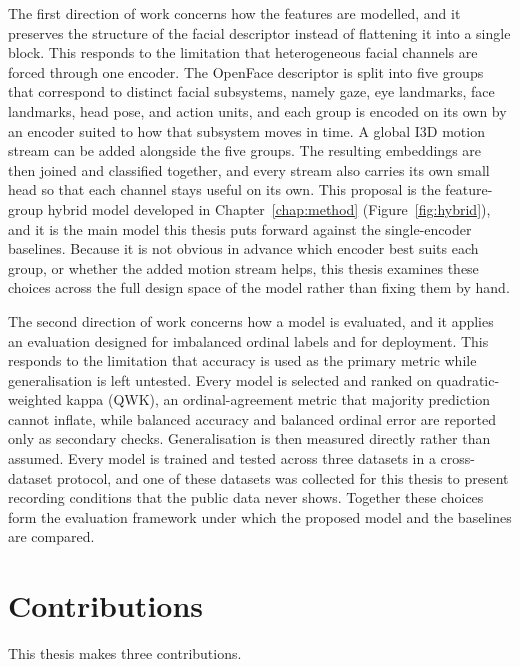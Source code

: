 \documentclass[../main.tex]{subfiles}
\begin{document}
The first direction of work concerns how the features are modelled, and it preserves the structure of the facial descriptor instead of flattening it into a single block. This responds to the limitation that heterogeneous facial channels are forced through one encoder. The OpenFace descriptor is split into five groups that correspond to distinct facial subsystems, namely gaze, eye landmarks, face landmarks, head pose, and action units, and each group is encoded on its own by an encoder suited to how that subsystem moves in time. A global I3D motion stream can be added alongside the five groups. The resulting embeddings are then joined and classified together, and every stream also carries its own small head so that each channel stays useful on its own. This proposal is the feature-group hybrid model developed in Chapter~\ref{chap:method} (Figure~\ref{fig:hybrid}), and it is the main model this thesis puts forward against the single-encoder baselines. Because it is not obvious in advance which encoder best suits each group, or whether the added motion stream helps, this thesis examines these choices across the full design space of the model rather than fixing them by hand.

The second direction of work concerns how a model is evaluated, and it applies an evaluation designed for imbalanced ordinal labels and for deployment. This responds to the limitation that accuracy is used as the primary metric while generalisation is left untested. Every model is selected and ranked on quadratic-weighted kappa (QWK), an ordinal-agreement metric that majority prediction cannot inflate, while balanced accuracy and balanced ordinal error are reported only as secondary checks. Generalisation is then measured directly rather than assumed. Every model is trained and tested across three datasets in a cross-dataset protocol, and one of these datasets was collected for this thesis to present recording conditions that the public data never shows. Together these choices form the evaluation framework under which the proposed model and the baselines are compared.

\FloatBarrier
\section{Contributions}
\label{sec:contributions}

This thesis makes three contributions.
\end{document}
